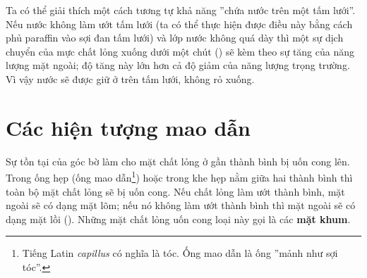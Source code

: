 
Ta có thể giải thích một cách tương tự khả năng ''chứa nước trên một tấm lưới''. Nếu nước không làm ướt tấm lưới (ta có thể thực hiện được điều này bằng cách phủ paraffin vào sợi đan tấm lưới) và lớp nước không quá dày thì một sự dịch chuyển của mực chất lỏng xuống dưới một chút () sẽ kèm theo sự tăng của năng lượng mặt ngoài; độ tăng này lớn hơn cả độ giảm của năng lượng trọng trường. Vì vậy nước sẽ được giữ ở trên tấm lưới, không rỏ xuống.


\section{Các hiện tượng mao dẫn}\label{sec:14_5}


Sự tồn tại của góc bờ làm cho mặt chất lỏng ở gần thành bình bị uốn cong lên. Trong ống hẹp (ống mao dẫn\footnote{Tiếng Latin \textit{capillus} có nghĩa là tóc. Ống mao dẫn là ống ''mảnh như sợi tóc''.}) hoặc trong khe hẹp nằm giữa hai thành bình thì toàn bộ mặt chất lỏng sẽ bị uốn cong. Nếu chất lỏng làm ướt thành bình, mặt ngoài sẽ có dạng mặt lõm; nếu nó không làm ướt thành bình thì mặt ngoài sẽ có dạng mặt lồi (). Những mặt chất lỏng uốn cong loại này gọi là các \textbf{mặt khum}.

